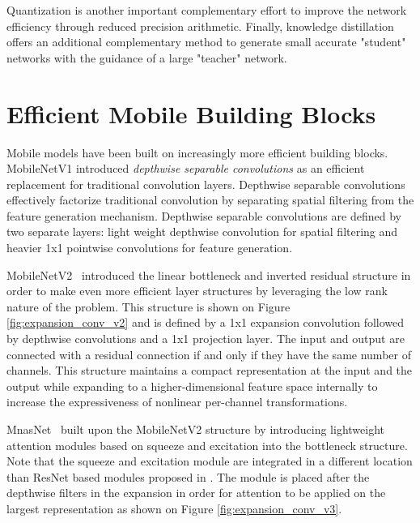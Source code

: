 \documentclass[10pt,twocolumn,letterpaper]{article}
\begin{document}
Quantization \cite{fakequant,quantwhite,QCNN,SouHub14,Increment_quant,DoReFa-Net,Xnor-Net} is another important complementary effort to improve the network efficiency through reduced precision arithmetic. Finally, knowledge distillation \cite{ModelCompression,Distill} offers an additional complementary method to generate small accurate "student" networks with the guidance of a large "teacher" network.

\section{Efficient Mobile Building Blocks}
\label{section:building}
Mobile models have been built on increasingly more efficient building blocks. MobileNetV1 \cite{MobilenetV1} introduced {\it depthwise separable convolutions} as an efficient replacement for traditional convolution layers. Depthwise separable convolutions effectively factorize traditional convolution by separating spatial filtering from the feature generation mechanism. Depthwise separable convolutions are defined by two separate layers: light weight depthwise convolution for spatial filtering and heavier 1x1 pointwise convolutions for feature generation.

MobileNetV2~\cite{mobilenetv2} introduced the linear bottleneck and inverted residual structure in order to make even more efficient layer structures by leveraging the low rank nature of the problem. This structure is shown on Figure \ref{fig:expansion_conv_v2} and is defined by a 1x1 expansion convolution followed by depthwise convolutions and a 1x1 projection layer. The input and output are connected with a residual connection if and only if they have the same number of channels. This structure maintains a compact representation at the input and the output while expanding to a higher-dimensional feature space internally to increase the expressiveness of nonlinear per-channel transformations.

MnasNet~\cite{mnasnet} built upon the MobileNetV2 structure by introducing lightweight attention modules based on squeeze and excitation into the bottleneck structure. Note that the squeeze and excitation module are integrated in a different location than ResNet based modules proposed in \cite{squeezeandexcite}. The module is placed after the depthwise filters in the expansion in order for attention to be applied on the largest representation as shown on Figure \ref{fig:expansion_conv_v3}.
\end{document}
